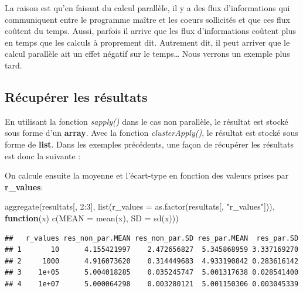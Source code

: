 \documentclass[
]{book}
\newenvironment{Shaded}{\begin{snugshade}}{\end{snugshade}}
\newcommand{\AttributeTok}[1]{\textcolor[rgb]{0.77,0.63,0.00}{#1}}
\newcommand{\ControlFlowTok}[1]{\textcolor[rgb]{0.13,0.29,0.53}{\textbf{#1}}}
\newcommand{\DecValTok}[1]{\textcolor[rgb]{0.00,0.00,0.81}{#1}}
\newcommand{\FunctionTok}[1]{\textcolor[rgb]{0.00,0.00,0.00}{#1}}
\newcommand{\NormalTok}[1]{#1}
\newcommand{\OtherTok}[1]{\textcolor[rgb]{0.56,0.35,0.01}{#1}}
\newcommand{\SpecialCharTok}[1]{\textcolor[rgb]{0.00,0.00,0.00}{#1}}
\newcommand{\StringTok}[1]{\textcolor[rgb]{0.31,0.60,0.02}{#1}}
\theoremstyle{definition}
\theoremstyle{definition}
\theoremstyle{definition}
\theoremstyle{definition}
\theoremstyle{remark}
\begin{document}
La raison est qu'en faisant du calcul parallèle, il y a des flux d'informations qui communiquent entre le programme maître et les coeurs sollicités et que ces flux coûtent du temps. Aussi, parfois il arrive que les flux d'informations coûtent plus en temps que les calculs à proprement dit. Autrement dit, il peut arriver que le calcul parallèle ait un effet négatif sur le temps\ldots{} Nous verrons un exemple plus tard.

\hypertarget{ruxe9cupuxe9rer-les-ruxe9sultats}{%
\subsection{Récupérer les résultats}\label{ruxe9cupuxe9rer-les-ruxe9sultats}}

En utilisant la fonction \emph{sapply()} dans le cas non parallèle, le résultat est stocké sous forme d'un \textbf{array}. Avec la fonction \emph{clusterApply()}, le résultat est stocké sous forme de \textbf{list}. Dans les exemples précédents, une façon de récupérer les résultats est donc la suivante :

\begin{Shaded}
\end{Shaded}

On calcule ensuite la moyenne et l'écart-type en fonction des valeurs prises par \textbf{r\_values}:

\begin{Shaded}
\begin{Highlighting}[]
\FunctionTok{aggregate}\NormalTok{(resultats[, }\DecValTok{2}\SpecialCharTok{:}\DecValTok{3}\NormalTok{], }\FunctionTok{list}\NormalTok{(}\AttributeTok{r\_values =} \FunctionTok{as.factor}\NormalTok{(resultats[, }\StringTok{"r\_values"}\NormalTok{])), }
          \ControlFlowTok{function}\NormalTok{(x) }\FunctionTok{c}\NormalTok{(}\AttributeTok{MEAN =} \FunctionTok{mean}\NormalTok{(x), }\AttributeTok{SD =} \FunctionTok{sd}\NormalTok{(x)))}
\end{Highlighting}
\end{Shaded}

\begin{verbatim}
##   r_values res_non_par.MEAN res_non_par.SD res_par.MEAN  res_par.SD
## 1       10      4.155421997    2.472656827  5.345868959 3.337169270
## 2     1000      4.916073620    0.314449683  4.933190842 0.283616142
## 3    1e+05      5.004018285    0.035245747  5.001317638 0.028541400
## 4    1e+07      5.000064298    0.003280121  5.001150306 0.003045339
\end{verbatim}
\end{document}
